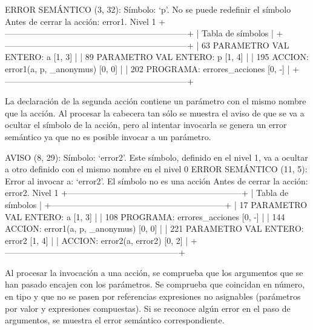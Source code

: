 \begin{codigo}
ERROR SEMÁNTICO (3, 32): Símbolo: `p'. No se puede redefinir el símbolo
Antes de cerrar la acción: error1. Nivel 1
+-----------------------------------------------------------------+
| Tabla de símbolos                                                      |
+-----------------------------------------------------------------+
|    63  PARAMETRO VAL ENTERO:     a [1, 3]                              |
|    89  PARAMETRO VAL ENTERO:     p [1, 4]                              |
|   195  ACCION:                   error1(a, p, _anonymus) [0, 0]        |
|   202  PROGRAMA:                 errores_acciones [0, -]               |
+-----------------------------------------------------------------+
\end{codigo}

La declaración de la segunda acción contiene un parámetro con el mismo nombre que la acción. Al procesar la cabecera tan sólo se muestra el aviso de que se va a ocultar el símbolo de la acción, pero al intentar invocarla se genera un error semántico ya que no es posible invocar a un parámetro.

\begin{codigo}
AVISO (8, 29): Símbolo: `error2'. Este símbolo, definido en el nivel 1, va a ocultar a otro definido con el mismo nombre en el nivel 0
ERROR SEMÁNTICO (11, 5): Error al invocar a: `error2'. El símbolo no es una acción
Antes de cerrar la acción: error2. Nivel 1
+--------------------------------------------------------------+
| Tabla de símbolos                                                   |
+--------------------------------------------------------------+
|    17  PARAMETRO VAL ENTERO:     a [1, 3]                           |
|   108  PROGRAMA:                 errores_acciones [0, -]            |
|   144  ACCION:                   error1(a, p, _anonymus) [0, 0]     |
|   221  PARAMETRO VAL ENTERO:     error2 [1, 4]                      |
|        ACCION:                   error2(a, error2) [0, 2]           |
+--------------------------------------------------------------+
\end{codigo}

Al procesar la invocación a una acción, se comprueba que los argumentos que se han pasado encajen con los parámetros. Se comprueba que coincidan en número, en tipo y que no se pasen por referencias expresiones no asignables (parámetros por valor y expresiones compuestas). Si se reconoce algún error en el paso de argumentos, se muestra el error semántico correspondiente.

